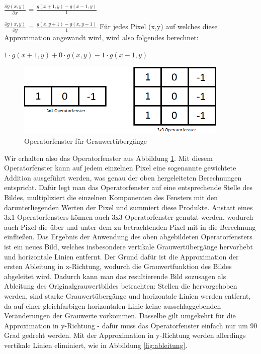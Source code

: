 \documentclass[12pt, a4paper]{article}
\begin{document}
$\frac{\partial g(x,y)}{\partial x}$ = $\frac{g(x+1,y)-g(x-1,y)}{1}$
\newline

$\frac{\partial g(x,y)}{\partial y}$ = $\frac{g(x,y+1)-g(x,y-1)}{1}$
\newline
\newline
Für jedes Pixel (x,y) auf welches diese Approximation angewandt wird, wird also folgendes berechnet:
\newline

$1\cdot g(x+1,y)+0\cdot g(x,y)-1\cdot g(x-1,y)$
\newline

\begin{figure}[t]
\centering
\includegraphics[width=0.9\textwidth]{img/operatorfenster.png}
\caption{Operatorfenster für Grauwertübergänge}
\label{fig:OpFenster}
\end{figure}

Wir erhalten also das Operatorfenster aus Abbildung \ref{fig:OpFenster}. Mit diesem Operatorfenster kann auf jedem einzelnen Pixel eine sogenannte gewichtete Addition ausgeführt werden, was genau der oben hergeleiteten Berechnungen entspricht. Dafür legt man das Operatorfenster auf eine entsprechende Stelle des Bildes, multipliziert die einzelnen Komponenten des Fensters mit den darunterliegenden Werten der Pixel und summiert diese Produkte. Anstatt eines 3x1 Operatorfensters können auch 3x3 Operatorfenster genutzt werden, wodurch auch Pixel die über und unter dem zu betrachtenden Pixel mit in die Berechnung einfließen. Das Ergebnis der Anwendung des oben abgebildeten Operatorfensters ist ein neues Bild, welches insbesondere vertikale Grauwertübergänge hervorhebt und horizontale Linien entfernt. Der Grund dafür ist die Approximation der ersten Ableitung in x-Richtung, wodurch die Grauwertfunktion des Bildes abgeleitet wird. Dadurch kann man das resultierende Bild sozusagen als Ableitung des Originalgrauwertbildes betrachten: Stellen die hervorgehoben werden, sind starke Grauwertübergänge und horizontale Linien werden entfernt, da auf einer gleichfarbigen horizontalen Linie keine ausschlaggebenden Veränderungen der Grauwerte vorkommen. Dasselbe gilt umgekehrt für die Approximation in y-Richtung - dafür muss das Operatorfenster einfach nur um 90 Grad gedreht werden. Mit der Approximation in y-Richtung werden allerdings vertikale Linien eliminiert, wie in Abbildung \ref{fig:ableitung}.
\end{document}
